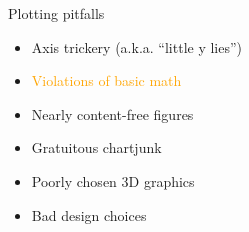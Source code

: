 \documentclass[
  ignorenonframetext,
]{beamer}
\providecommand{\tightlist}{%
  \setlength{\itemsep}{0pt}\setlength{\parskip}{0pt}}
\begin{document}
\begin{frame}{Plotting pitfalls}
\label{plotting-pitfalls-1}
\begin{itemize}
\tightlist
\item
  Axis trickery (a.k.a. ``little y lies'')
\item
  \textcolor{orange}{Violations of basic math}
\item
  Nearly content-free figures
\item
  Gratuitous chartjunk
\item
  Poorly chosen 3D graphics
\item
  Bad design choices
\end{itemize}
\end{frame}

\begin{frame}{}
\label{section-8}
\end{frame}

\begin{frame}{}
\label{section-9}
\end{frame}
\end{document}
